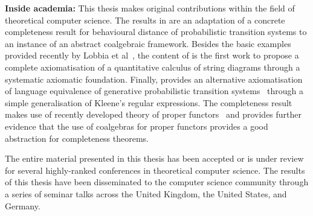 \begin{impactstatement}
\textbf{Inside academia:} This thesis makes original contributions within the field of theoretical computer science. The results in  are an adaptation of a concrete completeness result for behavioural distance of probabilistic transition systems to an instance of an abstract coalgebraic framework. Besides the basic examples provided recently by Lobbia et al~\cite{Lobbia:2024:Quantitative}, the content of  is the first work to propose a complete axiomatisation of a quantitative calculus of string diagrams through a systematic axiomatic foundation. Finally,  provides an alternative axiomatisation of language equivalence of generative probabilistic transition systems~\cite{Glabbeek:1995:Reactive} through a simple generalisation of Kleene’s regular expressions. The completeness result makes use of recently developed theory of proper functors~\cite{Milius:2018:Proper} and provides further evidence that the use of coalgebras for proper functors provides a good abstraction for completeness theorems.

The entire material presented in this thesis has been accepted or is under review for several highly-ranked conferences in theoretical computer science. The results of this thesis have been disseminated to the computer science community through a series of seminar talks across the United Kingdom, the United States, and Germany. 
\end{impactstatement}


%

\setcounter{tocdepth}{2} 

\tableofcontents
\listoffigures

